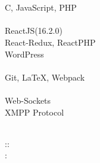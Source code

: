 \documentclass[]{hemant-style}
\begin{document}
\begin{minipage}[]{\textwidth}
\begin{minipage}{\textwidth}
\begin{minipage}[t][][c]{.25\textwidth}
                             \newline
                             \\
                            \\
                            C, 
                            JavaScript, PHP\\
                            \\
                            ReactJS(16.2.0) \\React-Redux, ReactPHP\\
                            WordPress\\
                            \\
                            Git, \LaTeX, Webpack\\
                            \\
                            Web-Sockets \\XMPP Protocol\\
                            \vspace{1em}
                        \end{minipage}
                        \begin{minipage}[t][][c]{.75\textwidth}
                             \\
                            ::\\
                            :

\end{minipage}
\end{minipage}
\end{minipage}
\end{document}
